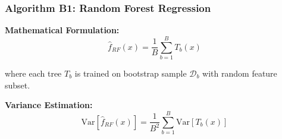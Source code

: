 \documentclass[12pt]{article}
\begin{document}
\subsubsection{Algorithm B1: Random Forest Regression}

\textbf{Mathematical Formulation:}
\begin{equation}
\hat{f}_{RF}(x) = \frac{1}{B}\sum_{b=1}^{B} T_b(x)
\end{equation}

where each tree $T_b$ is trained on bootstrap sample $\mathcal{D}_b$ with random feature subset.

\textbf{Variance Estimation:}
\begin{equation}
\text{Var}[\hat{f}_{RF}(x)] = \frac{1}{B^2}\sum_{b=1}^{B}\text{Var}[T_b(x)]
\end{equation}
\end{document}
